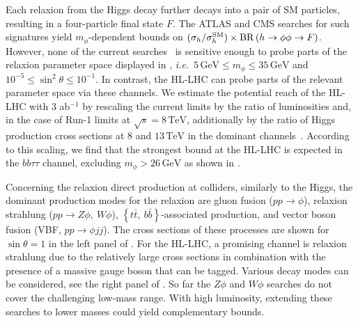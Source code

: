 Each relaxion from the Higgs decay further decays into a pair of SM particles, resulting in a four-particle final state $F$. The ATLAS and CMS
searches for such signatures yield $m_{\phi}$-dependent bounds on
$(\sigma_h/\sigma_h^{\rm SM}) \times {\rm BR}\left(h\to\phi\phi \to F\right)$.
However, none of the current
searches~\cite{CMS:2018lqr,Khachatryan:2017mnf,Aaboud:2018esj,CMS:2018wii,CMS-PAS-HIG-16-035,Aaboud:2018fvk,Aaboud:2018iil,Aaboud:2018gmx} is sensitive enough to probe parts of the relaxion parameter space displayed in
, \textit{i.e.}~$5\,\textrm{GeV} \leq m_{\phi} \leq 35\,\textrm{GeV}$
and $10^{-5}\leq \sin^2\theta \leq 10^{-1}$. 
In contrast, the HL-LHC can probe parts of the relevant parameter space via these channels.
We estimate the potential reach of the
HL-LHC with 3 ab$^{-1}$ by rescaling the current limits by the ratio of luminosities and, in the case
of Run-1 limits at $\sqrt{s}=8\,\textrm{TeV}$, additionally by the ratio of Higgs production cross sections at
$8$ and $13\,\textrm{TeV}$ in the dominant channels~\cite{xsecratio}.
According to this scaling, we find that the strongest bound at the HL-LHC is expected in the $bb\tau\tau$ channel, excluding $m_{\phi}>26\,\textrm{GeV}$ as shown in . 


Concerning the relaxion direct production at colliders, similarly to the Higgs, the dominant production modes for the relaxion are gluon fusion ($ p  p \to \phi $), relaxion strahlung ($ p  p \to Z \phi,~W\phi$),  $\left\lbrace t\bar t,~b\bar b \right\rbrace$-associated production, and vector boson fusion (VBF, $p p \to \phi j j$).
The cross sections of these processes are shown for $\sin\theta=1$ in the left panel of . 
%
For the HL-LHC, a promising channel is relaxion strahlung due to the relatively large cross sections in combination with the presence of a massive gauge boson that can be tagged. Various decay modes can be considered, see the right panel of .
So far the $Z\phi$ and $W\phi$ searches do not cover the challenging low-mass range. With high luminosity, extending these searches to lower masses could yield complementary bounds.


